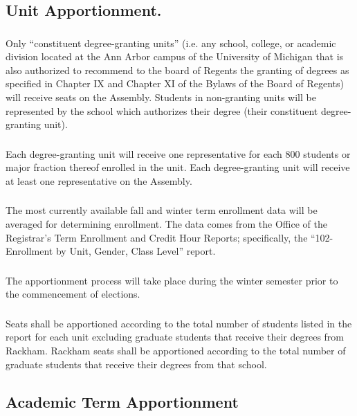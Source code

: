 \subsection{Unit Apportionment.}
\subsubsection{}
Only ``constituent degree-granting units'' (i.e. any school, college, or academic division located at the Ann Arbor campus of the University of Michigan that is also authorized to recommend to the board of Regents the granting of degrees as specified in Chapter IX and Chapter XI of the Bylaws of the Board of Regents) will receive seats on the Assembly.  Students in non-granting units will be represented by the school which authorizes their degree (their constituent degree-granting unit).
\subsubsection{}
Each degree-granting unit will receive one representative for each 800 students or major fraction thereof enrolled in the unit.  Each degree-granting unit will receive at least one representative on the Assembly.
\subsubsection{}
The most currently available fall and winter term enrollment data will be averaged for determining enrollment.  The data comes from the Office of the Registrar's Term Enrollment and Credit Hour Reports; specifically, the ``102-Enrollment by Unit, Gender, Class Level'' report. 
\subsubsection{}
The apportionment process will take place during the winter semester prior to the commencement of elections.
\subsubsection{}
Seats shall be apportioned according to the total number of students listed in the report for each unit excluding graduate students that receive their degrees from Rackham.  Rackham seats shall be apportioned according to the total number of graduate students that receive their degrees from that school.

\subsection{Academic Term Apportionment}
